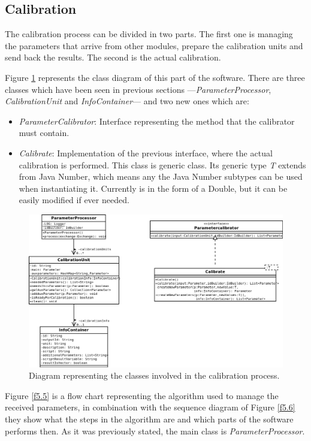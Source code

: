 \subsection{Calibration}
The calibration process can be divided in two parts. The first one is managing the parameters that arrive from other modules, prepare the calibration units and send back the results. The second is the actual calibration. 

Figure \ref{f5.4} represents the class diagram of this part of the software. There are three classes which have been seen in previous sections ---\emph{ParameterProcessor}, \emph{CalibrationUnit} and \emph{InfoContainer}--- and two new ones which are:
\begin{itemize}
\item \emph{ParameterCalibrator}: Interface representing the method that the calibrator must contain.
\item \emph{Calibrate}: Implementation of the previous interface, where the actual calibration is performed. This class is generic class. Its generic type \emph{T} extends from Java Number, which means any the Java Number subtypes can be used when instantiating it. Currently is in the form of a Double, but it can be easily modified if ever needed.
\end{itemize}


\begin{figure}[H]
\centerline{\includegraphics[width=1.2\textwidth]{images/CalibrationClassDiagram.png}}
\caption{Diagram representing the classes involved in the calibration process.}
\label{f5.4}
\end{figure}

Figure \ref{f5.5} is a flow chart representing the algorithm used to manage the received parameters, in combination with the sequence diagram of Figure \ref{f5.6} they show what the steps in the algorithm are and which parts of the software performs then. As it was previously stated, the main class is \emph{ParameterProcessor}.


